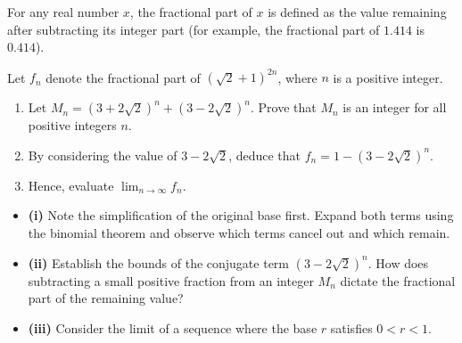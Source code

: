 \begin{problem}
For any real number $x$, the fractional part of $x$ is defined as the value remaining after subtracting its integer part (for example, the fractional part of $1.414$ is $0.414$). 

Let $f_n$ denote the fractional part of $(\sqrt{2} + 1)^{2n}$, where $n$ is a positive integer.

\begin{enumerate}[label=(\roman*)]
    \item Let $M_n = (3 + 2\sqrt{2})^n + (3 - 2\sqrt{2})^n$. Prove that $M_n$ is an integer for all positive integers $n$.
    \item By considering the value of $3 - 2\sqrt{2}$, deduce that $f_n = 1 - (3 - 2\sqrt{2})^n$.
    \item Hence, evaluate $\lim_{n \to \infty} f_n$.
\end{enumerate}
\end{problem}

\begin{hint}
\begin{itemize}
    \item \textbf{(i)} Note the simplification of the original base first. Expand both terms using the binomial theorem and observe which terms cancel out and which remain.
    \item \textbf{(ii)} Establish the bounds of the conjugate term $(3 - 2\sqrt{2})^n$. How does subtracting a small positive fraction from an integer $M_n$ dictate the fractional part of the remaining value?
    \item \textbf{(iii)} Consider the limit of a sequence where the base $r$ satisfies $0 < r < 1$.
\end{itemize}
\end{hint}

